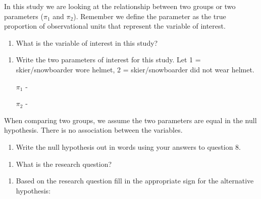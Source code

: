 \documentclass[
]{report}
\providecommand{\tightlist}{%
  \setlength{\itemsep}{0pt}\setlength{\parskip}{0pt}}
\begin{document}
In this study we are looking at the relationship between two groups or two parameters (\(\pi_1\) and \(\pi_2\)). Remember we define the parameter as the true proportion of observational units that represent the variable of interest.

\begin{enumerate}
\def\labelenumi{\arabic{enumi}.}
\setcounter{enumi}{6}
\tightlist
\item
  What is the variable of interest in this study?
\end{enumerate}

\vspace{0.5in}

\begin{enumerate}
\def\labelenumi{\arabic{enumi}.}
\setcounter{enumi}{7}
\item
  Write the two parameters of interest for this study. Let 1 = skier/snowboarder wore helmet, 2 = skier/snowboarder did not wear helmet.

  \(\pi_1\) -
  \vspace{0.5in}

  \(\pi_2\) -
  \vspace{0.5in}
\end{enumerate}

When comparing two groups, we assume the two parameters are equal in the null hypothesis. There is no association between the variables.

\begin{enumerate}
\def\labelenumi{\arabic{enumi}.}
\setcounter{enumi}{8}
\tightlist
\item
  Write the null hypothesis out in words using your answers to question 8.
\end{enumerate}

\vspace{1in}

\begin{enumerate}
\def\labelenumi{\arabic{enumi}.}
\setcounter{enumi}{9}
\tightlist
\item
  What is the research question?
\end{enumerate}

\vspace{1in}

\begin{enumerate}
\def\labelenumi{\arabic{enumi}.}
\setcounter{enumi}{10}
\tightlist
\item
  Based on the research question fill in the appropriate sign for the alternative hypothesis:
  \vspace{0.25in}
\end{enumerate}
\end{document}
